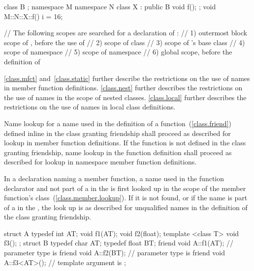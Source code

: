 \begin{example}
\begin{codeblock}
class B { };
namespace M {
  namespace N {
    class X : public B {
      void f();
    };
  }
}
void M::N::X::f() {
  i = 16;
}

// The following scopes are searched for a declaration of :
// 1) outermost block scope of , before the use of 
// 2) scope of class 
// 3) scope of 's base class 
// 4) scope of namespace 
// 5) scope of namespace 
// 6) global scope, before the definition of 
\end{codeblock}
\end{example} \begin{note} \ref{class.mfct} and~\ref{class.static} further
describe the restrictions on the use of names in member function
definitions. \ref{class.nest} further describes the restrictions on the
use of names in the scope of nested classes. \ref{class.local} further
describes the restrictions on the use of names in local class
definitions. \end{note}

\pnum
Name lookup for a name used in the definition of a 
function~(\ref{class.friend}) defined inline in the class granting
friendship shall proceed as described for lookup in member function
definitions. If the  function is not defined in the class
granting friendship, name lookup in the  function
definition shall proceed as described for lookup in namespace member
function definitions.

\pnum
In a  declaration naming a member function, a name used in
the function declarator and not part of a 
in the  is first looked up in the scope of the
member function's class~(\ref{class.member.lookup}). If it is not found,
or if the name is part of a
 in
the , the look up is
as described for unqualified names in the definition of the class
granting friendship. \begin{example}

\begin{codeblock}
struct A {
  typedef int AT;
  void f1(AT);
  void f2(float);
  template <class T> void f3();
};
struct B {
  typedef char AT;
  typedef float BT;
  friend void A::f1(AT);      // parameter type is 
  friend void A::f2(BT);      // parameter type is 
  friend void A::f3<AT>();    // template argument is 
};
\end{codeblock}
\end{example}

